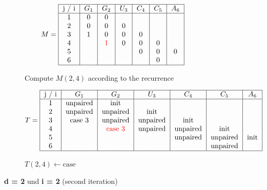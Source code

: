\begin{figure}[H]
    \centering
    \begin{subfigure}[t]{0.25\textwidth}
        \scriptsize
        \[
            M =  \begin{tabular}{|c|c|c|c|c|c|c|}
                     \hline
                     j / i & $G_1$ & $G_2$              & $U_3$ & $C_4$ & $C_5$ & $A_6$ \\ \hline
                     1     & 0     & 0                  &       &       &       &       \\
                     2     & 0     & 0                  & 0     &       &       &       \\
                     3     & 1     & 0                  & 0     & 0     &       &       \\
                     4     &       & \textcolor{red}{1} & 0     & 0     & 0     &       \\
                     5     &       &                    &       & 0     & 0     & 0     \\
                     6     &       &                    &       &       & 0     &       \\ \hline
            \end{tabular}
        \]
        \caption{ Compute $M(2,4)$ according to the recurrence}
    \end{subfigure}
    \hfill
    \begin{subfigure}[t]{0.65\textwidth}
        \scriptsize
        \[
            T =     \begin{tabular}{|c|c|c|c|c|c|c|}
                        \hline
                        j / i & $G_1$    & $G_2$                   & $U_3$    & $C_4$    & $C_5$    & $A_6$ \\ \hline
                        1     & unpaired & init                    &          &          &          &       \\
                        2     & unpaired & unpaired                & init     &          &          &       \\
                        3     & case 3   & unpaired                & unpaired & init     &          &       \\
                        4     &          & \textcolor{red}{case 3} & unpaired & unpaired & init     &       \\
                        5     &          &                         &          & unpaired & unpaired & init  \\
                        6 & \textcolor{white}{unpaired} & \textcolor{white}{unpaired} & \textcolor{white}{unpaired}
                        &
                        & unpaired
                        & \textcolor{white}{init}
                        \\ \hline
            \end{tabular}
        \]
        \caption{$T(2,4) \gets \text{case}$ }
    \end{subfigure}
    \caption{\textbf{d = 2} und \textbf{i = 2} (second iteration)}\label{fig:figure12}

\end{figure}

